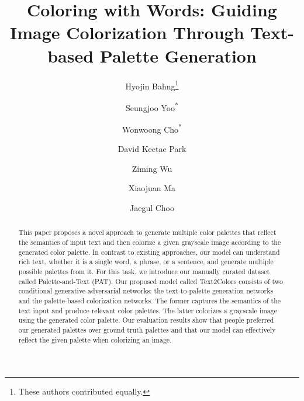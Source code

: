 \documentclass[runningheads]{llncs}
\begin{document}
%
\title{Coloring with Words: Guiding Image Colorization Through Text-based Palette Generation} 

%
\makeatletter
\renewcommand*{\@fnsymbol}[1]{\ifcase#1\or*\else\@arabic{\numexpr#1-1\relax}\fi}
\makeatother

\author{Hyojin Bahng\thanks{These authors contributed equally.}
\and Seungjoo Yoo\textsuperscript{*}
\and Wonwoong Cho\textsuperscript{*}
\and David Keetae Park  
\and Ziming Wu
\and Xiaojuan Ma
\and Jaegul Choo}
%
%

%
\maketitle              %
%
\begin{abstract}
This paper proposes a novel approach to generate multiple color palettes that reflect the semantics of input text and then colorize a given grayscale image according to the generated color palette. In contrast to existing approaches, our model can understand rich text, whether it is a single word, a phrase, or a sentence, and generate multiple possible palettes from it. For this task, we introduce our manually curated dataset called Palette-and-Text (PAT). Our proposed model called Text2Colors consists of two conditional generative adversarial networks: the text-to-palette generation networks and the palette-based colorization networks. The former captures the semantics of the text input and produce relevant color palettes. The latter colorizes a grayscale image using the generated color palette. Our evaluation results show that people preferred our generated palettes over ground truth palettes and that our model can effectively reflect the given palette when colorizing an image.


\end{abstract}
%
%
%
\end{document}
